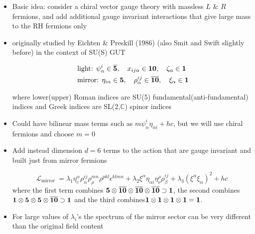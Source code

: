   \begin{itemize}
  \item Basic idea: consider a chiral vector gauge theory with massless \(L\) \& \(R\) fermions, and add additional gauge invariant interactions that give large mass to the RH fermions only
  \item originally studied by Eichten \& Preskill (1986) (also Smit and Swift slightly before) in the context of SU(S) GUT

\begin{equation}
    \begin{aligned}
& \text { light: } \psi_{\alpha}^{i} \in \overline{\bf 5}, \quad x_{i j \alpha}\in  {\bf 10},\quad \zeta_{\alpha}\in {\bf 1} \\
& \text { mirror: } \eta_{ {i \alpha }} \in {\bf5}, \quad \rho_{\alpha}^{i j} \in \overline{\bf 10}, \quad \xi_{\alpha} \in {\bf 1}
\end{aligned}
\end{equation}

where lower(upper) Roman indices are SU(5) fundamental(anti-fundamental) indices and Greek indices are SL(2,$\mathbb{C}$) spinor indices

  \item Could have bilinear mass terms such as  \(m \psi_{\alpha}^{i} \eta_{\alpha i}+h c\), but we will use chiral fermions and choose \(m=0\)
  \item Add instead dimension $d=6$ terms to the action that are gauge invariant and built just from mirror fermions

\begin{equation}
\mathcal{L}_{\text {mirror }}=  \lambda_{1} \eta_{c}^{\alpha} \rho_{\alpha}^{i j} \rho_{\rho}^{m n} \rho^{p k l}  \epsilon^{k l m n}+\lambda_{2} \xi^{\alpha} \eta_{\alpha i} \eta_{\nu}^{\rho} \rho_{\beta}^{i j}+\lambda_{3}\left(\xi^{\alpha} \xi_{\alpha}\right)^{2}+h c 
\end{equation}
where the first term combines ${\bf 5}\otimes\overline{\bf 10}\otimes\overline{\bf 10}\otimes\overline{\bf 10}\supset{\bf 1}$, the second combines ${\bf 1}\otimes{\bf 5}\otimes{\bf 5}\otimes\overline{\bf 10}\supset{\bf 1}$ and the third combines${\bf 1}\otimes{\bf 1}\otimes{\bf 1}\otimes{\bf 1}={\bf 1}$.

  \item For large values of \(\lambda_{i}\)'s the spectrum of the mirror sector can be very different than the original field content


\end{itemize}
